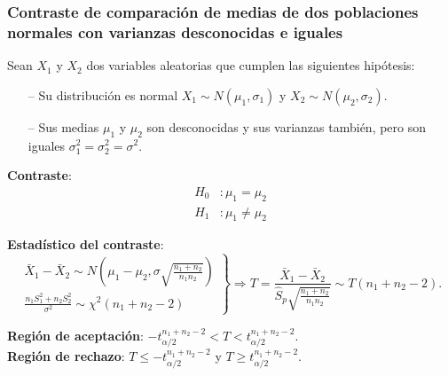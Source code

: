 \begin{frame}
\frametitle{Contraste de comparación de medias de dos poblaciones normales con varianzas desconocidas e iguales}
Sean $X_1$ y $X_2$ dos variables aleatorias que cumplen las siguientes hipótesis:
\begin{itemize}
\item[--] Su distribución es normal $X_1\sim N(\mu_1,\sigma_1)$ y $X_2\sim N(\mu_2,\sigma_2)$.
\item[--] Sus medias $\mu_1$ y $\mu_2$ son desconocidas y sus varianzas también, pero son iguales
$\sigma^2_1=\sigma^2_2=\sigma^2$.
\end{itemize}
\textbf{Contraste}:
\begin{align*} 
H_0 &: \mu_1=\mu_2\\
H_1 &: \mu_1\neq \mu_2
\end{align*}

\textbf{Estadístico del contraste}:
{\footnotesize
\[
\left.
\begin{array}{l}
\bar{X}_1-\bar{X}_2\sim N\left(\mu_1-\mu_2,\sigma\sqrt{\frac{n_1+n_2}{n_1n_2}} \right)\\
\displaystyle \frac{n_1S_1^2+n_2S_2^2}{\sigma^2} \sim \chi^2(n_1+n_2-2)
\end{array}
\right\}
\Rightarrow
T=\frac{\bar{X}_1-\bar{X}_2}{\hat{S}_p\sqrt{\frac{n_1+n_2}{n_1n_2}}} \sim T(n_1+n_2-2).
\]
}

\textbf{Región de aceptación}: $-t^{n_1+n_2-2}_{\alpha/2}< T < t^{n_1+n_2-2}_{\alpha/2}$.\\
\textbf{Región de rechazo}: $T\leq -t^{n_1+n_2-2}_{\alpha/2}$ y $T\geq t^{n_1+n_2-2}_{\alpha/2}$.
\end{frame}


